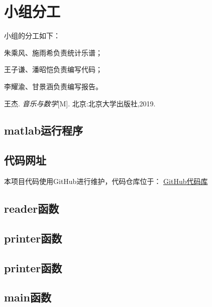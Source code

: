 \documentclass[12pt, a4paper, oneside]{ctexart}
\begin{document}
	\section{小组分工}
	小组的分工如下：
	
	朱乘风、施雨希负责统计乐谱；
	
	王子谦、潘昭恺负责编写代码；
	
	李耀渝、甘景涵负责编写报告。
	
	\begin{thebibliography}{99}
		王杰. \emph{音乐与数学}[M]. 北京:北京大学出版社,2019.
	\end{thebibliography}
	
	\newpage
	
	\begin{appendices}
		\linespread{1.25}
		\renewcommand{\thesection}{\Alph{section}}
		\section{matlab运行程序}
		\subsection{代码网址}
		本项目代码使用GitHub进行维护，代码仓库位于：
		\href{https://github.com/Music-and-Math-Group-Work/Music-and-Math}{GitHub代码库}
	

		\subsection{reader函数}
		
		
		\newpage
		\subsection{printer函数}
		

		\newpage
		\subsection{printer函数}
		
		
		\newpage
		\subsection{main函数}
		
		 
		
	\end{appendices}
	
\end{document}
